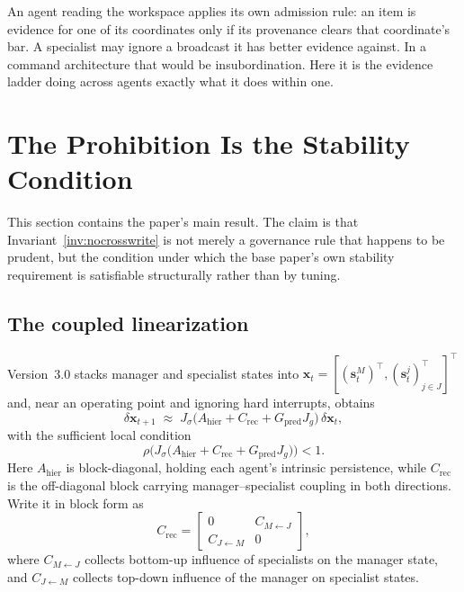 \documentclass[11pt]{article}
\newcommand{\sM}{\mathbf{s}^{M}}
\newcommand{\sJ}{\mathbf{s}^{j}}
\begin{document}
An agent reading the workspace applies its own admission rule: an item is evidence for one of its coordinates only if its provenance clears that coordinate's bar. A specialist may ignore a broadcast it has better evidence against. In a command architecture that would be insubordination. Here it is the evidence ladder doing across agents exactly what it does within one.

\section{The Prohibition Is the Stability Condition}
\label{sec:stability}

This section contains the paper's main result. The claim is that Invariant~\ref{inv:nocrosswrite} is not merely a governance rule that happens to be prudent, but the condition under which the base paper's own stability requirement is satisfiable structurally rather than by tuning.

\subsection{The coupled linearization}

Version~3.0 stacks manager and specialist states into $\mathbf{x}_t=[(\sM_t)^\top,(\sJ_t)^\top_{j\in J}]^\top$ and, near an operating point and ignoring hard interrupts, obtains
\begin{equation}
\delta\mathbf{x}_{t+1}\;\approx\;J_\sigma\big(A_{\mathrm{hier}}+C_{\mathrm{rec}}+G_{\mathrm{pred}}J_g\big)\,\delta\mathbf{x}_t ,
\label{eq:lin}
\end{equation}
with the sufficient local condition
\begin{equation}
\rho\Big(J_\sigma\big(A_{\mathrm{hier}}+C_{\mathrm{rec}}+G_{\mathrm{pred}}J_g\big)\Big)<1 .
\label{eq:stab}
\end{equation}
Here $A_{\mathrm{hier}}$ is block-diagonal, holding each agent's intrinsic persistence, while $C_{\mathrm{rec}}$ is the off-diagonal block carrying manager--specialist coupling in both directions. Write it in block form as
\begin{equation}
C_{\mathrm{rec}}=
\begin{bmatrix}
0 & C_{M\leftarrow J}\\[2pt]
C_{J\leftarrow M} & 0
\end{bmatrix},
\label{eq:crec}
\end{equation}
where $C_{M\leftarrow J}$ collects bottom-up influence of specialists on the manager state, and $C_{J\leftarrow M}$ collects top-down influence of the manager on specialist states.
\end{document}
